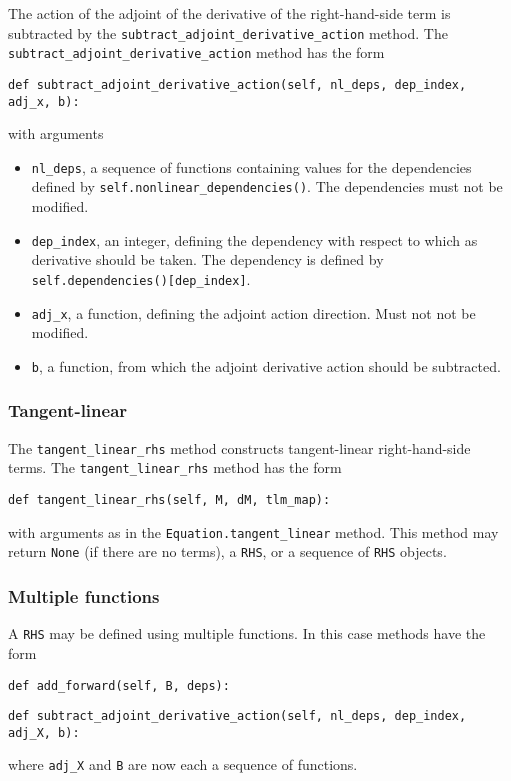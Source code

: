 \documentclass[11pt]{article}
\begin{document}
The action of the adjoint of the derivative of the right-hand-side term is
subtracted by the \texttt{subtract\_adjoint\_derivative\_action} method. The
\texttt{subtract\_adjoint\_derivative\_action} method has the form
\begin{lstlisting}
def subtract_adjoint_derivative_action(self, nl_deps, dep_index, adj_x, b):
\end{lstlisting}
with arguments
\begin{itemize}
  \item \texttt{nl\_deps}, a sequence of functions containing values for the
    dependencies defined by \texttt{self.nonlinear\_dependencies()}. The
    dependencies must not be modified.
  \item \texttt{dep\_index}, an integer, defining the dependency with respect
    to which as derivative should be taken. The dependency is defined by
    \texttt{self.dependencies()[dep\_index]}.
  \item \texttt{adj\_x}, a function, defining the adjoint action direction.
    Must not not be modified.
  \item \texttt{b}, a function, from which the adjoint derivative action should
    be subtracted.
\end{itemize}

\subsubsection{Tangent-linear}

The \texttt{tangent\_linear\_rhs} method constructs tangent-linear
right-hand-side terms. The \texttt{tangent\_linear\_rhs} method has the form
\begin{lstlisting}
def tangent_linear_rhs(self, M, dM, tlm_map):
\end{lstlisting}
with arguments as in the \texttt{Equation.tangent\_linear} method. This method
may return \texttt{None} (if there are no terms), a \texttt{RHS}, or a sequence
of \texttt{RHS} objects.

\subsubsection{Multiple functions}

A \texttt{RHS} may be defined using multiple functions. In this case methods
have the form
\begin{lstlisting}
def add_forward(self, B, deps):
\end{lstlisting}
\begin{lstlisting}
def subtract_adjoint_derivative_action(self, nl_deps, dep_index, adj_X, b):
\end{lstlisting}
where \texttt{adj\_X} and \texttt{B} are now each a sequence of functions. 
\end{document}
